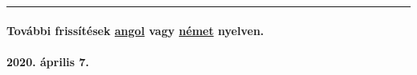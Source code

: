 \begin{center}\rule{0.5\linewidth}{\linethickness}\end{center}

\hypertarget{tovuxe1bbi-frissuxedtuxe9sek-angol-vagy-nuxe9met-nyelven}{%
\paragraph{\texorpdfstring{További frissítések
\href{https://swprs.org/a-swiss-doctor-on-covid-19/}{angol} vagy
\href{https://swprs.org/covid-19-hinweis-ii/}{német}
nyelven.}{További frissítések angol vagy német nyelven.}}\label{tovuxe1bbi-frissuxedtuxe9sek-angol-vagy-nuxe9met-nyelven}}

\hypertarget{2020-uxe1prilis-7}{%
\paragraph{2020. április 7.}\label{2020-uxe1prilis-7}}

